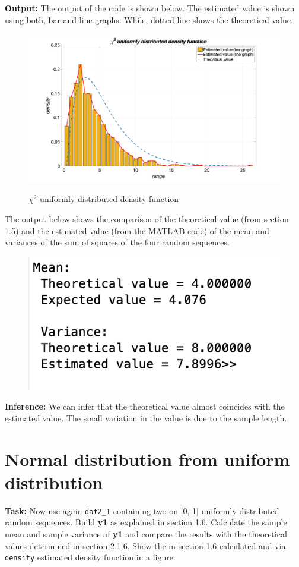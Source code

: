  \noindent \textbf{Output:}
 \noindent The output of the code is shown below. The estimated value is shown using both, bar and line graphs. While, dotted line shows the theoretical value. 
\begin{figure}[H]
\centering
{\includegraphics[scale=0.16]{ass5_1.png}}
\caption{$\chi^2$ uniformly distributed density function }
\end{figure}
\noindent The output below shows the comparison of the theoretical value (from section 1.5) and the estimated value (from the MATLAB code) of the mean and variances of the sum of squares of the four random sequences.
\begin{figure}[H]
\centering
{\includegraphics[scale=0.63]{ass5_2.png}}
\end{figure}

\noindent \textbf{Inference:} We can infer that the theoretical value almost coincides with the estimated value. The small variation in the value is due to the sample length.



\section{ Normal distribution from uniform distribution  }  \label{ Normal distribution from uniform distribution }
\noindent \textbf{Task:} Now use again \texttt{dat2\_1} containing two on [0, 1] uniformly distributed random sequences. Build \textbf{y1} as explained in section 1.6. Calculate the sample mean and sample variance of \textbf{y1} and compare the results with the theoretical values determined in section 2.1.6. Show the in section 1.6 calculated and via \texttt{density} estimated density function in a figure. 


